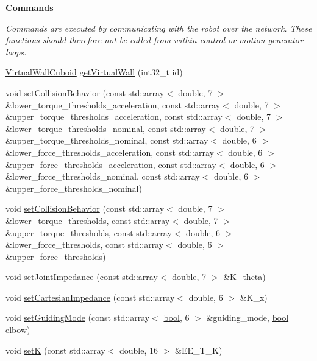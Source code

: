\begin{Indent}\textbf{ Commands}\par
{\em Commands are executed by communicating with the robot over the network. These functions should therefore not be called from within control or motion generator loops. }\begin{DoxyCompactItemize}
\item 
\hyperlink{structfranka_1_1VirtualWallCuboid}{Virtual\+Wall\+Cuboid} \hyperlink{classfranka_1_1Robot_a1739f6dc13f0c33b3213375323c93399}{get\+Virtual\+Wall} (int32\+\_\+t id)
\item 
void \hyperlink{classfranka_1_1Robot_a168e1214ac36d74ac64f894332b84534}{set\+Collision\+Behavior} (const std\+::array$<$ double, 7 $>$ \&lower\+\_\+torque\+\_\+thresholds\+\_\+acceleration, const std\+::array$<$ double, 7 $>$ \&upper\+\_\+torque\+\_\+thresholds\+\_\+acceleration, const std\+::array$<$ double, 7 $>$ \&lower\+\_\+torque\+\_\+thresholds\+\_\+nominal, const std\+::array$<$ double, 7 $>$ \&upper\+\_\+torque\+\_\+thresholds\+\_\+nominal, const std\+::array$<$ double, 6 $>$ \&lower\+\_\+force\+\_\+thresholds\+\_\+acceleration, const std\+::array$<$ double, 6 $>$ \&upper\+\_\+force\+\_\+thresholds\+\_\+acceleration, const std\+::array$<$ double, 6 $>$ \&lower\+\_\+force\+\_\+thresholds\+\_\+nominal, const std\+::array$<$ double, 6 $>$ \&upper\+\_\+force\+\_\+thresholds\+\_\+nominal)
\item 
void \hyperlink{classfranka_1_1Robot_aa188f58c9025594be4d1700da744a962}{set\+Collision\+Behavior} (const std\+::array$<$ double, 7 $>$ \&lower\+\_\+torque\+\_\+thresholds, const std\+::array$<$ double, 7 $>$ \&upper\+\_\+torque\+\_\+thresholds, const std\+::array$<$ double, 6 $>$ \&lower\+\_\+force\+\_\+thresholds, const std\+::array$<$ double, 6 $>$ \&upper\+\_\+force\+\_\+thresholds)
\item 
void \hyperlink{classfranka_1_1Robot_aa18a28697cf6e3be16c6cff2dd839560}{set\+Joint\+Impedance} (const std\+::array$<$ double, 7 $>$ \&K\+\_\+theta)
\item 
void \hyperlink{classfranka_1_1Robot_ac2678c5c31cc8c0627ecda7485f81f6d}{set\+Cartesian\+Impedance} (const std\+::array$<$ double, 6 $>$ \&K\+\_\+x)
\item 
void \hyperlink{classfranka_1_1Robot_a7992cee203e66f9a61fe2f318ef88a26}{set\+Guiding\+Mode} (const std\+::array$<$ \hyperlink{classbool}{bool}, 6 $>$ \&guiding\+\_\+mode, \hyperlink{classbool}{bool} elbow)
\item 
void \hyperlink{classfranka_1_1Robot_ad1cf59d1b11306d80cd3c7144a989c56}{setK} (const std\+::array$<$ double, 16 $>$ \&E\+E\+\_\+\+T\+\_\+K)

\end{DoxyCompactItemize}
\end{Indent}
